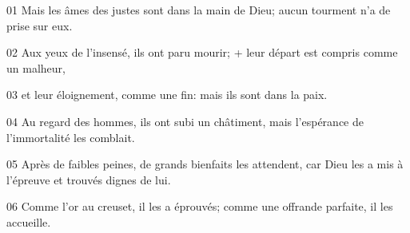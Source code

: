 01 Mais les âmes des justes sont dans la main de Dieu;  aucun tourment n’a de prise sur eux.

02 Aux yeux de l’insensé, ils ont paru mourir; + leur départ est compris comme un malheur,

03 et leur éloignement, comme une fin: mais ils sont dans la paix.

04 Au regard des hommes, ils ont subi un châtiment, mais l’espérance de l’immortalité les comblait.

05 Après de faibles peines, de grands bienfaits les attendent, car Dieu les a mis à l’épreuve et trouvés dignes de lui.

06 Comme l’or au creuset, il les a éprouvés; comme une offrande parfaite, il les accueille.

